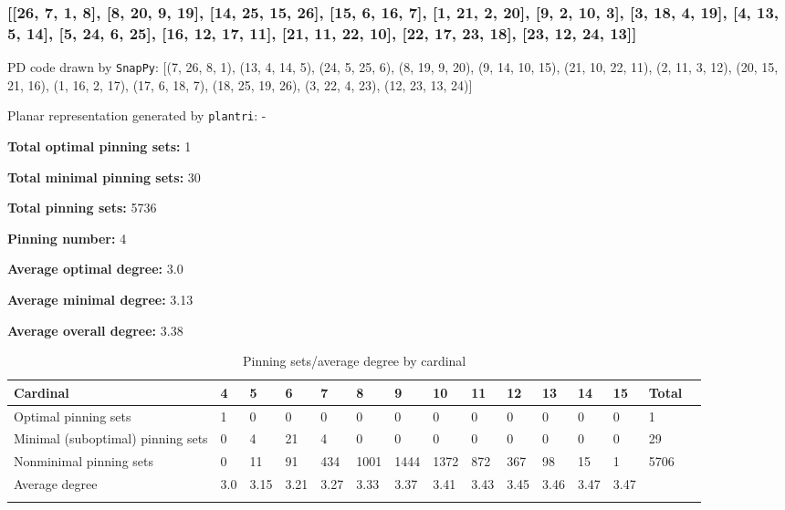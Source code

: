 \documentclass{article}%
\begin{document}
\newpage

\subsubsection{[[26, 7, 1, 8], [8, 20, 9, 19], [14, 25, 15, 26], [15, 6, 16, 7], [1, 21, 2, 20], [9, 2, 10, 3], [3, 18, 4, 19], [4, 13, 5, 14], [5, 24, 6, 25], [16, 12, 17, 11], [21, 11, 22, 10], [22, 17, 23, 18], [23, 12, 24, 13]]}

{\small\noindent PD code drawn by \texttt{SnapPy}: [(7, 26, 8, 1), (13, 4, 14, 5), (24, 5, 25, 6), (8, 19, 9, 20), (9, 14, 10, 15), (21, 10, 22, 11), (2, 11, 3, 12), (20, 15, 21, 16), (1, 16, 2, 17), (17, 6, 18, 7), (18, 25, 19, 26), (3, 22, 4, 23), (12, 23, 13, 24)]}

{\small\noindent Planar representation generated by \texttt{plantri}: -}

\begin{multicols}{2}
{\normalsize \noindent\textbf{Total optimal pinning sets:} 1

\noindent\textbf{Total minimal pinning sets:} 30

\noindent\textbf{Total pinning sets:} 5736

\noindent\textbf{Pinning number:} 4

}
\columnbreak

{\normalsize \noindent\textbf{Average optimal degree:} 3.0

\noindent\textbf{Average minimal degree:} 3.13

\noindent\textbf{Average overall degree:} 3.38

}
\end{multicols}

\begin{table}[ht]
	\caption{Pinning sets/average degree by cardinal}
	\centering
	\renewcommand{\arraystretch}{1.5}
	\begin{tabularx}{\textwidth}{lXXXXXXXXXXXXXX}
		\toprule
			Cardinal & 4 & 5 & 6 & 7 & 8 & 9 & 10 & 11 & 12 & 13 & 14 & 15 & Total\\
			\hline
			Optimal pinning sets & 1 & 0 & 0 & 0 & 0 & 0 & 0 & 0 & 0 & 0 & 0 & 0 & 1 \\
			Minimal (suboptimal) pinning sets & 0 & 4 & 21 & 4 & 0 & 0 & 0 & 0 & 0 & 0 & 0 & 0 & 29 \\
			Nonminimal pinning sets & 0 & 11 & 91 & 434 & 1001 & 1444 & 1372 & 872 & 367 & 98 & 15 & 1 & 5706 \\
			Average degree & 3.0 & 3.15 & 3.21 & 3.27 & 3.33 & 3.37 & 3.41 & 3.43 & 3.45 & 3.46 & 3.47 & 3.47 &  \\
		\bottomrule \\ 
	\end{tabularx}
\end{table}
\end{document}
